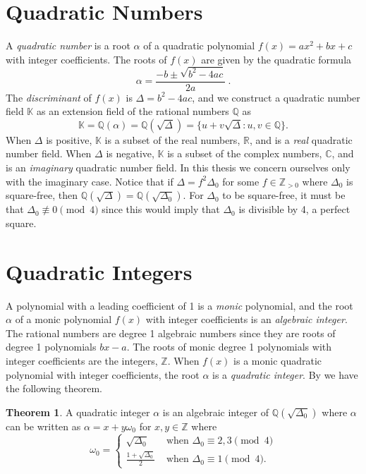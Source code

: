 \documentclass{ucalgthes1}
\theoremstyle{definition}
\newtheorem{thm}{Theorem}[section]
\newcommand{\CC}{\mathbb{C}}
\newcommand{\RR}{\mathbb{R}}
\newcommand{\KK}{\mathbb{K}}
\newcommand{\ZZ}{\mathbb{Z}}
\newcommand{\QQ}{\mathbb{Q}}
\newcommand{\ZZgtz}{\mathbb{Z}_{>0}}
\begin{document}
\section{Quadratic Numbers}

A \emph{quadratic number} is a root $\alpha$ of a quadratic polynomial $f(x) = ax^2 + bx + c$ with integer coefficients. The roots of $f(x)$ are given by the quadratic formula
\[
	\alpha = \frac{-b \pm \sqrt{b^2 - 4ac}}{2a} ~.
\]
The \emph{discriminant} of $f(x)$ is $\Delta = b^2 - 4ac$, and we construct a quadratic number field $\KK$ as an extension field of the rational numbers $\QQ$ as
\[
	\KK = \QQ(\alpha) = \QQ(\sqrt{\Delta}) = \{u + v\sqrt{\Delta} : u,v \in \QQ\}.
\]
When $\Delta$ is positive, $\KK$ is a subset of the real numbers, $\RR$, and is a \emph{real} quadratic number field. When $\Delta$ is negative, $\KK$ is a subset of the complex numbers, $\CC$, and is an \emph{imaginary} quadratic number field.  In this thesis we concern ourselves only with the imaginary case.  Notice that if $\Delta = f^2 \Delta_0$ for some $f \in \ZZgtz$ where $\Delta_0$ is square-free, then $\QQ(\sqrt{\Delta}) = \QQ(\sqrt{\Delta_0})$. For $\Delta_0$ to be square-free, it must be that $\Delta_0 \not\equiv 0 \pmod 4$ since this would imply that $\Delta_0$ is divisible by 4, a perfect square.  


\bigbreak
\section{Quadratic Integers}

A polynomial with a leading coefficient of 1 is a \emph{monic} polynomial, and the root $\alpha$ of a monic polynomial $f(x)$ with integer coefficients is an \emph{algebraic integer}. The rational numbers are degree 1 algebraic numbers since they are roots of degree 1 polynomials $bx-a$.  The roots of monic degree 1 polynomials with integer coefficients are the integers, $\ZZ$.  When $f(x)$ is a monic quadratic polynomial with integer coefficients, the root $\alpha$ is a \emph{quadratic integer}. By \cite[p.77]{Jacobson2009} we have the following theorem.

\begin{thm}
A quadratic integer $\alpha$ is an algebraic integer of $\QQ(\sqrt{\Delta_0})$ where $\alpha$ can be written as $\alpha = x + y \omega_0$ for $x, y \in \ZZ$ where
\begin{equation*}
	\omega_0 = \begin{cases}
		\sqrt{\Delta_0} & \textrm{ when } \Delta_0 \equiv 2, 3 \pmod 4 \\
		\frac{1+\sqrt{\Delta_0}}{2} & \textrm{ when } \Delta_0 \equiv 1 \pmod 4.
	\end{cases}
\end{equation*}
\end{thm}
\end{document}
